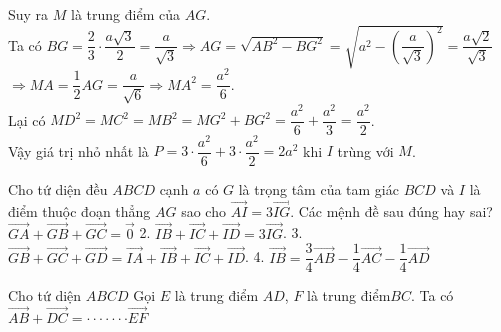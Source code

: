 \begin{ex}
{\begin{enumerate}[a)]
			Suy ra $M$ là trung điểm của $AG$.\\
			Ta có $BG=\dfrac{2}{3} \cdot \dfrac{a\sqrt{3}}{2}=\dfrac{a}{\sqrt{3}}\Rightarrow AG=\sqrt{AB^2-BG^2}=\sqrt{a^2-{{\left(\dfrac{a}{\sqrt{3}}\right)}^2}}=\dfrac{a\sqrt{2}}{\sqrt{3}}$\\
			$\Rightarrow MA=\dfrac{1}{2}AG=\dfrac{a}{\sqrt{6}}\Rightarrow MA^2=\dfrac{a^2}{6}$.\\
			Lại có $MD^2=MC^2=MB^2=MG^2+BG^2=\dfrac{a^2}{6}+\dfrac{a^2}{3}=\dfrac{a^2}{2}$.\\
			Vậy giá trị nhỏ nhất là $P=3 \cdot \dfrac{a^2}{6}+3 \cdot \dfrac{a^2}{2}=2a^2$ khi $I$ trùng với $M$.
		\end{enumerate}
		
	}
\end{ex}
\begin{ex}
	Cho tứ diện đều $ABCD$ cạnh $a$ có $G$ là trọng tâm của tam giác $BCD$ và $I$ là điểm thuộc đoạn thẳng $AG$ sao cho $\vec{AI}=3\vec{IG}$. Các mệnh đề sau đúng hay sai?
	\choiceTF
	{$\vec{GA}+\vec{GB}+\vec{GC}=\vec{0}$}
	2. $\vec{IB}+\vec{IC}+\vec{ID}=3\vec{IG}$.
	3. $\vec{GB}+\vec{GC}+\vec{GD}=\vec{IA}+\vec{IB}+\vec{IC}+\vec{ID}$.
	4. $\vec{IB}=\dfrac{3}{4}\vec{AB}-\dfrac{1}{4}\vec{AC}-\dfrac{1}{4}\vec{AD}$
\end{ex}
\begin{ex}
	Cho tứ diện $ABCD$ Gọi $E$ là trung điểm $AD$, $F$ là trung điểm$BC$. Ta có $\vec{AB}+\vec{DC}= \cdot \cdot \cdot \cdot \cdot \cdot \cdot \vec{EF}$
\end{ex}
